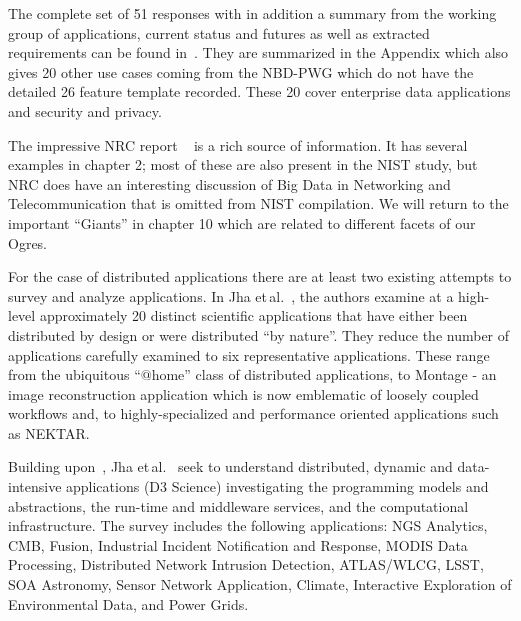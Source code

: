 \documentclass{acm_proc_article-sp}
\begin{document}
The complete set of 51 responses with in addition a summary from the working group of applications, current status and futures as well as extracted requirements can be found in~\cite{b21}. They are summarized in the Appendix which also gives 20 other use cases coming from the NBD-PWG which do not have the detailed 26 feature template recorded. These 20 cover enterprise data applications and security and privacy.


The impressive NRC report ~\cite{b13} is a rich source of information. It has several examples in chapter 2; most of these are also present in the NIST study, but NRC does have an interesting discussion of Big Data in Networking and Telecommunication that is omitted from NIST compilation. We will return to the important ``Giants'' in chapter 10 which are related to different facets of our Ogres.

For the case of distributed applications there are at least two existing attempts to survey and analyze applications. In Jha et\,al.~\cite{b26}, the authors examine at a high-level approximately 20 distinct scientific applications that have either been distributed by design or were distributed ``by nature''.  They reduce the number of applications carefully examined to six representative applications. These range from the ubiquitous ``$@$home'' class of distributed applications, to Montage - an image reconstruction application which is now emblematic of loosely coupled workflows and, to highly-specialized and performance oriented applications such as NEKTAR.

Building upon~\cite{b26}, Jha et\,al.~\cite{b28} seek to understand distributed, dynamic and data-intensive applications (D3 Science) investigating the programming models and abstractions, the run-time and middleware services, and the computational infrastructure. The survey includes the following applications: NGS Analytics, CMB, Fusion, Industrial Incident Notification and Response, MODIS Data Processing, Distributed Network Intrusion Detection, ATLAS/WLCG, LSST, SOA Astronomy, Sensor Network Application, Climate, Interactive Exploration of Environmental Data, and Power Grids.
\end{document}
